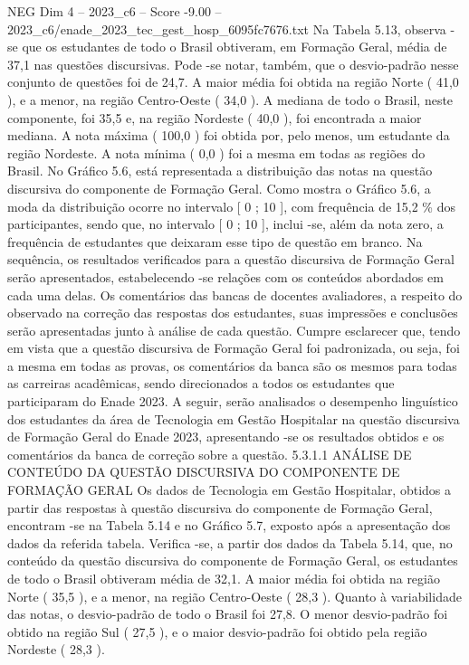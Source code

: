 \begin{textsample}{NEG Dim 4 – 2023\_c6 – Score -9.00 – 2023\_c6/enade\_2023\_tec\_gest\_hosp\_6095fc7676.txt}
Na Tabela 5.13, observa -se que os estudantes de todo o Brasil obtiveram, em Formação Geral, média de 37,1 nas questões discursivas.
Pode -se notar, também, que o desvio-padrão nesse conjunto de questões foi de 24,7.
A maior média foi obtida na região Norte ( 41,0 ), e a menor, na região Centro-Oeste ( 34,0 ).
A mediana de todo o Brasil, neste componente, foi 35,5 e, na região Nordeste ( 40,0 ), foi encontrada a maior mediana.
A nota máxima ( 100,0 ) foi obtida por, pelo menos, um estudante da região Nordeste.
A nota mínima ( 0,0 ) foi a mesma em todas as regiões do Brasil.
No Gráfico 5.6, está representada a distribuição das notas na questão discursiva do componente de Formação Geral.
Como mostra o Gráfico 5.6, a moda da distribuição ocorre no intervalo [ 0 ; 10 ], com frequência de 15,2 \% dos participantes, sendo que, no intervalo [ 0 ; 10 ], inclui -se, além da nota zero, a frequência de estudantes que deixaram esse tipo de questão em branco.
Na sequência, os resultados verificados para a questão discursiva de Formação Geral serão apresentados, estabelecendo -se relações com os conteúdos abordados em cada uma delas.
Os comentários das bancas de docentes avaliadores, a respeito do observado na correção das respostas dos estudantes, suas impressões e conclusões serão apresentadas junto à análise de cada questão.
Cumpre esclarecer que, tendo em vista que a questão discursiva de Formação Geral foi padronizada, ou seja, foi a mesma em todas as provas, os comentários da banca são os mesmos para todas as carreiras acadêmicas, sendo direcionados a todos os estudantes que participaram do Enade 2023.
A seguir, serão analisados o desempenho linguístico dos estudantes da área de Tecnologia em Gestão Hospitalar na questão discursiva de Formação Geral do Enade 2023, apresentando -se os resultados obtidos e os comentários da banca de correção sobre a questão. 5.3.1.1 ANÁLISE DE CONTEÚDO DA QUESTÃO DISCURSIVA DO COMPONENTE DE FORMAÇÃO GERAL Os dados de Tecnologia em Gestão Hospitalar, obtidos a partir das respostas à questão discursiva do componente de Formação Geral, encontram -se na Tabela 5.14 e no Gráfico 5.7, exposto após a apresentação dos dados da referida tabela.
Verifica -se, a partir dos dados da Tabela 5.14, que, no conteúdo da questão discursiva do componente de Formação Geral, os estudantes de todo o Brasil obtiveram média de 32,1.
A maior média foi obtida na região Norte ( 35,5 ), e a menor, na região Centro-Oeste ( 28,3 ).
Quanto à variabilidade das notas, o desvio-padrão de todo o Brasil foi 27,8.
O menor desvio-padrão foi obtido na região Sul ( 27,5 ), e o maior desvio-padrão foi obtido pela região Nordeste ( 28,3 ).

\end{textsample}
